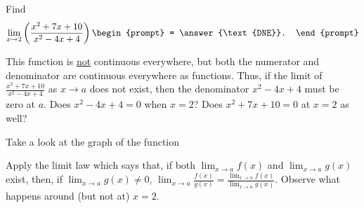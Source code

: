 \documentclass{ximera}
\author{Gregory Hartman \and Matthew Carr}
\begin{document}
\begin{exercise}




  Find 
  \[
  \lim_{x\to 2} \left({\frac{x^2+7x+10}{x^2-4x+4}}\right)
  \begin{prompt}
  = \answer{\text{DNE}}.
  \end{prompt}
  \]
    \begin{hint}
     This function is \underline{not} continuous everywhere, but both the numerator and denominator are continuous everywhere as functions. Thus, if the limit of $\frac{x^2+7x+10}{x^2-4x+4}$ as $x\to{a}$ does not exist, then the denominator $x^2-4x+4$ must be zero at $a$. Does $x^2-4x+4=0$ when $x=2$? Does $x^2+7x+10=0$ at $x=2$ as well?
    \end{hint}
     \begin{hint}
    	Take a look at the graph of the function
    \begin{center}
      \end{center} 
      Apply the limit law which says that, if both $\lim_{x\to a}f(x)$ and $\lim_{x\to a}g(x)$ exist, then, if $\lim_{x\to a}g(x)\ne0$, $\lim_{x\to{a}}\frac{f(x)}{g(x)}=\frac{\lim_{x\to a}f(x)}{\lim_{x\to{a}}g(x)}$. Observe what happens around (but not at) $x=2$.
    \end{hint}
    \begin{hint}

\end{hint}
\end{exercise}
\end{document}
